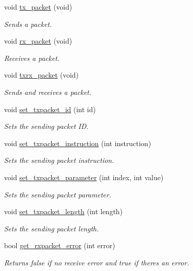 \begin{DoxyCompactItemize}
void \hyperlink{a00003_a479187cd8940c16dd4374eb5be22b888}{tx\+\_\+packet} (void)
\begin{DoxyCompactList}\small\item\em Sends a packet. \end{DoxyCompactList}\item 
void \hyperlink{a00003_aa26d2d2dff768563a1cb1480aa061608}{rx\+\_\+packet} (void)
\begin{DoxyCompactList}\small\item\em Receives a packet. \end{DoxyCompactList}\item 
void \hyperlink{a00003_aebfc569c6b1eb0b98f8c385f0f921fc0}{txrx\+\_\+packet} (void)
\begin{DoxyCompactList}\small\item\em Sends and receives a packet. \end{DoxyCompactList}\item 
void \hyperlink{a00003_a84e24c72c3e5be866f8b28c2e5bd1d95}{set\+\_\+txpacket\+\_\+id} (int id)
\begin{DoxyCompactList}\small\item\em Sets the sending packet I\+D. \end{DoxyCompactList}\item 
void \hyperlink{a00003_a209a43f983f214323b6f0a627d5e8c13}{set\+\_\+txpacket\+\_\+instruction} (int instruction)
\begin{DoxyCompactList}\small\item\em Sets the sending packet instruction. \end{DoxyCompactList}\item 
void \hyperlink{a00003_a2c3d31bbbed70a69918e9972a620384b}{set\+\_\+txpacket\+\_\+parameter} (int index, int value)
\begin{DoxyCompactList}\small\item\em Sets the sending packet parameter. \end{DoxyCompactList}\item 
void \hyperlink{a00003_a829278f48e21c810b172eb8cab3b86de}{set\+\_\+txpacket\+\_\+length} (int length)
\begin{DoxyCompactList}\small\item\em Sets the sending packet length. \end{DoxyCompactList}\item 
bool \hyperlink{a00003_a843b0aac721e4264e7e3097f80980243}{get\+\_\+rxpacket\+\_\+error} (int error)
\begin{DoxyCompactList}\small\item\em Returns false if no receive error and true if there\textquotesingle{}s an error. \end{DoxyCompactList}\item 

\end{DoxyCompactItemize}
